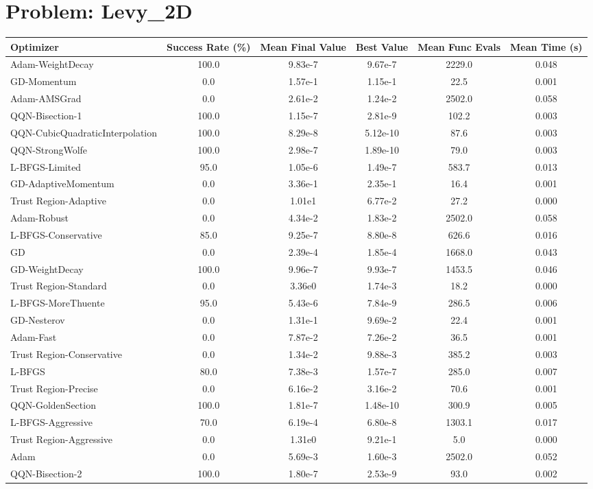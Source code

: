 \documentclass{article}
\begin{document}
\section{Problem: Levy\_2D}
\begin{longtable}{p{3cm}*{5}{c}}
\toprule
\textbf{Optimizer} & \textbf{Success Rate (\%)} & \textbf{Mean Final Value} & \textbf{Best Value} & \textbf{Mean Func Evals} & \textbf{Mean Time (s)} \\
\midrule
Adam-WeightDecay & 100.0 & 9.83e-7 & 9.67e-7 & 2229.0 & 0.048 \\
GD-Momentum & 0.0 & 1.57e-1 & 1.15e-1 & 22.5 & 0.001 \\
Adam-AMSGrad & 0.0 & 2.61e-2 & 1.24e-2 & 2502.0 & 0.058 \\
QQN-Bisection-1 & 100.0 & 1.15e-7 & 2.81e-9 & 102.2 & 0.003 \\
QQN-CubicQuadraticInterpolation & 100.0 & 8.29e-8 & 5.12e-10 & 87.6 & 0.003 \\
QQN-StrongWolfe & 100.0 & 2.98e-7 & 1.89e-10 & 79.0 & 0.003 \\
L-BFGS-Limited & 95.0 & 1.05e-6 & 1.49e-7 & 583.7 & 0.013 \\
GD-AdaptiveMomentum & 0.0 & 3.36e-1 & 2.35e-1 & 16.4 & 0.001 \\
Trust Region-Adaptive & 0.0 & 1.01e1 & 6.77e-2 & 27.2 & 0.000 \\
Adam-Robust & 0.0 & 4.34e-2 & 1.83e-2 & 2502.0 & 0.058 \\
L-BFGS-Conservative & 85.0 & 9.25e-7 & 8.80e-8 & 626.6 & 0.016 \\
GD & 0.0 & 2.39e-4 & 1.85e-4 & 1668.0 & 0.043 \\
GD-WeightDecay & 100.0 & 9.96e-7 & 9.93e-7 & 1453.5 & 0.046 \\
Trust Region-Standard & 0.0 & 3.36e0 & 1.74e-3 & 18.2 & 0.000 \\
L-BFGS-MoreThuente & 95.0 & 5.43e-6 & 7.84e-9 & 286.5 & 0.006 \\
GD-Nesterov & 0.0 & 1.31e-1 & 9.69e-2 & 22.4 & 0.001 \\
Adam-Fast & 0.0 & 7.87e-2 & 7.26e-2 & 36.5 & 0.001 \\
Trust Region-Conservative & 0.0 & 1.34e-2 & 9.88e-3 & 385.2 & 0.003 \\
L-BFGS & 80.0 & 7.38e-3 & 1.57e-7 & 285.0 & 0.007 \\
Trust Region-Precise & 0.0 & 6.16e-2 & 3.16e-2 & 70.6 & 0.001 \\
QQN-GoldenSection & 100.0 & 1.81e-7 & 1.48e-10 & 300.9 & 0.005 \\
L-BFGS-Aggressive & 70.0 & 6.19e-4 & 6.80e-8 & 1303.1 & 0.017 \\
Trust Region-Aggressive & 0.0 & 1.31e0 & 9.21e-1 & 5.0 & 0.000 \\
Adam & 0.0 & 5.69e-3 & 1.60e-3 & 2502.0 & 0.052 \\
QQN-Bisection-2 & 100.0 & 1.80e-7 & 2.53e-9 & 93.0 & 0.002 \\
\bottomrule
\end{longtable}
\end{document}
